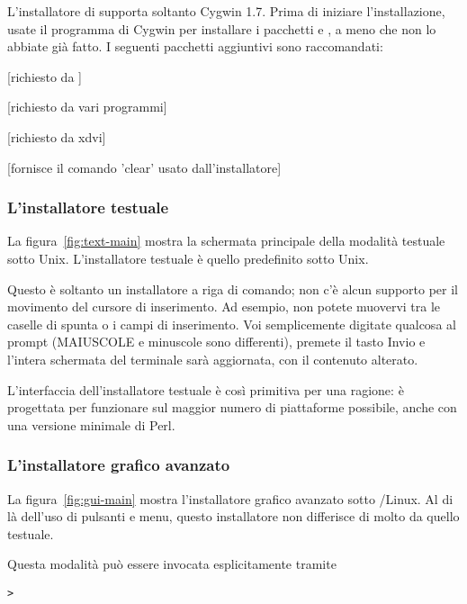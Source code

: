 \documentclass{article}
\begin{document}
L'installatore di \TL{} supporta soltanto Cygwin 1.7.
Prima di iniziare l'installazione, usate il programma 
di Cygwin per installare i pacchetti  e , a
meno che non lo abbiate già fatto. I seguenti pacchetti aggiuntivi sono
raccomandati:
\begin{itemize*}
\item {} [richiesto da \XeTeX]
\item {} [richiesto da vari programmi]
\item {} [richiesto da xdvi]
\item {} [fornisce il comando 'clear' usato
  dall'installatore]
\end{itemize*}

\subsubsection{L'installatore testuale}

La figura~\ref{fig:text-main} mostra la schermata principale della
modalità testuale sotto Unix. L'installatore testuale è quello
predefinito sotto Unix.

Questo è soltanto un installatore a riga di comando; non c'è alcun
supporto per il movimento del cursore di inserimento. Ad esempio, non
potete muovervi tra le caselle di spunta o i campi di inserimento.
Voi semplicemente digitate qualcosa al prompt (MAIUSCOLE e minuscole sono
differenti), premete il tasto Invio e l'intera schermata del terminale
sarà aggiornata, con il contenuto alterato.

L'interfaccia dell'installatore testuale è così primitiva per una ragione:
è progettata per funzionare sul maggior numero di piattaforme possibile,
anche con una versione minimale di Perl.

\subsubsection{L'installatore grafico avanzato}

La figura~\ref{fig:gui-main} mostra l'installatore grafico avanzato sotto
\GNU/Linux. Al di là dell'uso di pulsanti e menu, questo installatore non
differisce di molto da quello testuale.

Questa modalità può essere invocata esplicitamente tramite
\begin{alltt}
> 
\end{alltt}
\end{document}
